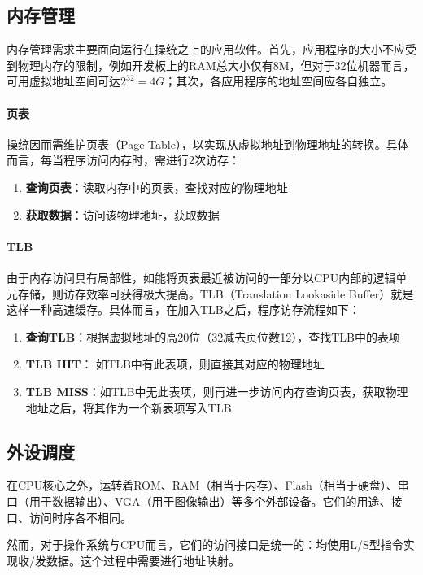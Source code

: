 \subsection{内存管理}

内存管理需求主要面向运行在操统之上的应用软件。首先，应用程序的大小不应受到物理内存的限制，例如开发板上的RAM总大小仅有8M，但对于32位机器而言，可用虚拟地址空间可达$2^{32} = 4G$；其次，各应用程序的地址空间应各自独立。

\paragraph{页表}
操统因而需维护页表（Page Table），以实现从虚拟地址到物理地址的转换。具体而言，每当程序访问内存时，需进行2次访存：
\begin{enumerate}
    \item {\bf 查询页表}：读取内存中的页表，查找对应的物理地址
    \item {\bf 获取数据}：访问该物理地址，获取数据
\end{enumerate}


\paragraph{TLB}
由于内存访问具有局部性，如能将页表最近被访问的一部分以CPU内部的逻辑单元存储，则访存效率可获得极大提高。TLB（Translation Lookaside Buffer）就是这样一种高速缓存。具体而言，在加入TLB之后，程序访存流程如下：

\begin{enumerate}
    \item {\bf 查询TLB}：根据虚拟地址的高20位（32减去页位数12），查找TLB中的表项
    \item {\bf TLB HIT}： 如TLB中有此表项，则直接其对应的物理地址
    \item {\bf TLB MISS}：如TLB中无此表项，则再进一步访问内存查询页表，获取物理地址之后，将其作为一个新表项写入TLB
\end{enumerate}

\subsection{外设调度}

在CPU核心之外，运转着ROM、RAM（相当于内存）、Flash（相当于硬盘）、串口（用于数据输出）、VGA（用于图像输出）等多个外部设备。它们的用途、接口、访问时序各不相同。

然而，对于操作系统与CPU而言，它们的访问接口是统一的：均使用L/S型指令实现收/发数据。这个过程中需要进行地址映射。


